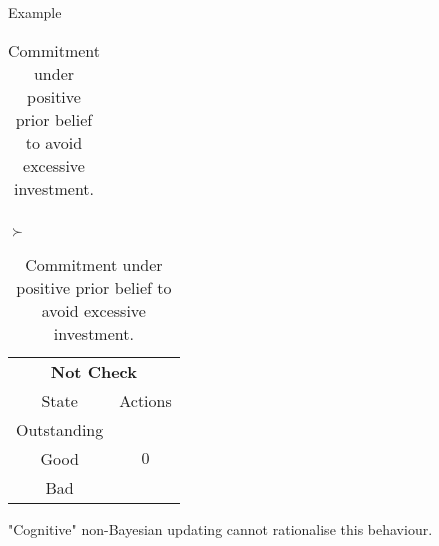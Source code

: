 \documentclass[usenames,dvipsnames,aspectratio=169,11pt, envcountsect]{beamer}
\begin{document}
\begin{frame}[noframenumbering]{Example}
\begin{table}[H]
\begin{minipage}{0.29\textwidth}
\begin{tabular}{c | c}
			\end{tabular}
			\vspace{0.5cm} %
		\end{minipage}\hspace{0.3cm} %
		\( \succ \) %
		\begin{minipage}{0.29\textwidth}
			\centering
			\begin{tabular}{c | c}
				\multicolumn{2}{c}{\textbf{Not Check}}  \\
				State       & Actions                   \\
				\hline
				Outstanding & \multirow{3}{*}{ \( 0 \)} \\
				Good        &                           \\
				Bad         &                           \\
			\end{tabular}
			\vspace{0.5cm} %
		\end{minipage}
		\caption{Commitment under positive prior belief to avoid excessive investment.} %
		\label{tab:commitment}
	\end{table}

	\vfill

	"Cognitive" non-Bayesian updating \citep{epsteinAxiomaticModelNonBayesian2006} cannot rationalise this behaviour.

\end{frame}
\end{document}
